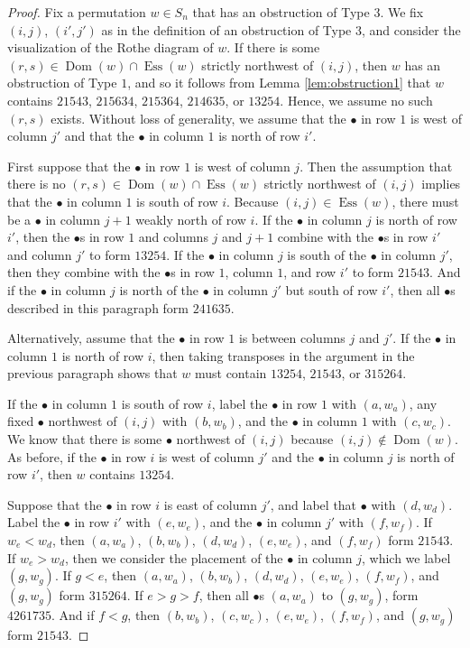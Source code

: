 \documentclass[ALCO,Unicode,published]{cedram}
\DeclareMathOperator{\Ess}{Ess}
\DeclareMathOperator{\Dom}{Dom}
\begin{document}
\begin{proof}
Fix a permutation $w \in S_n$ that has an obstruction of Type $3$.  We fix $(i,j)$, $(i',j')$ as in the definition of an obstruction of Type $3$, and consider the visualization of the Rothe diagram of $w$.  If there is some $(r,s) \in \Dom(w) \cap \Ess(w)$ strictly northwest of $(i,j)$, then $w$ has an obstruction of Type $1$,  and so it follows from Lemma \ref{lem:obstruction1} that $w$ contains $21543$, $215634$, $215364$, $214635$, or $13254$.  Hence, we assume no such $(r,s)$ exists.  Without loss of generality, we assume that the $\bullet$ in row $1$ is west of column $j'$ and that the $\bullet$ in column $1$ is north of row $i'$.  

First suppose that the $\bullet$ in row $1$ is west of column $j$.  Then the assumption that there is no $(r,s) \in \Dom(w) \cap \Ess(w)$ strictly northwest of $(i,j)$ implies that the $\bullet$ in column $1$ is south of row $i$.  Because $(i,j) \in \Ess(w)$, there must be a $\bullet$ in column $j+1$ weakly north of row $i$.  If the $\bullet$ in column $j$ is north of row $i'$, then the $\bullet$s in row $1$ and columns $j$ and $j+1$ combine with the $\bullet$s in row $i'$ and column $j'$ to form $13254$.  If the $\bullet$ in column $j$ is south of the $\bullet$ in column $j'$, then they combine with the $\bullet$s in row $1$, column $1$, and row $i'$ to form $21543$.  And if the $\bullet$ in column $j$ is north of the $\bullet$ in column $j'$ but south of row $i'$, then all $\bullet$s described in this paragraph form $241635$. 

Alternatively, assume that the $\bullet$ in row $1$ is between columns $j$ and $j'$.  If the $\bullet$ in column $1$ is north of row $i$, then taking transposes in the argument in the previous paragraph shows that $w$ must contain $13254$, $21543$, or $315264$.  

If the $\bullet$ in column $1$ is south of row $i$, label the $\bullet$ in row $1$ with $(a, w_a)$, any fixed $\bullet$ northwest of $(i,j)$ with $(b, w_b)$, and the $\bullet$ in column $1$ with $(c,w_c)$.  We know that there is some $\bullet$ northwest of $(i,j)$ because $(i,j) \notin \Dom(w)$.  As before, if the $\bullet$ in row $i$ is west of column $j'$ and the $\bullet$ in column $j$ is north of row $i'$, then $w$ contains $13254$.  

Suppose that the $\bullet$ in row $i$ is east of column $j'$, and label that $\bullet$ with $(d,w_d)$.  Label the $\bullet$ in row $i'$ with $(e,w_e)$, and the $\bullet$ in column $j'$ with $(f,w_f)$.  If $w_e<w_d$, then $(a,w_a)$, $(b,w_b)$, $(d,w_d)$, $(e,w_e)$, and $(f,w_f)$ form $21543$.  If $w_e>w_d$, then we consider the placement of the $\bullet$ in column $j$, which we label $(g,w_g)$.  If $g<e$, then $(a,w_a)$, $(b,w_b)$, $(d,w_d)$, $(e,w_e)$, $(f,w_f)$, and $(g,w_g)$ form $315264$.  If $e>g>f$, then all $\bullet$s $(a,w_a)$ to $(g,w_g)$, form $4261735$.  And if $f<g$, then $(b,w_b)$, $(c,w_c)$, $(e,w_e)$, $(f,w_f)$, and $(g,w_g)$ form $21543$.  


\end{proof}
\end{document}
